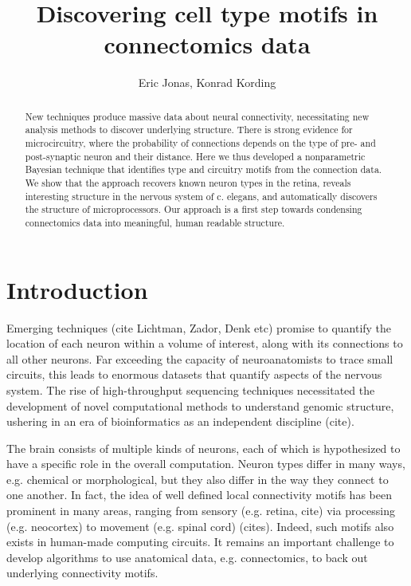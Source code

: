 \documentclass{article}
\title{Discovering cell type motifs in connectomics data}
\author{Eric Jonas, Konrad Kording}
\begin{document}
\maketitle


\begin{abstract}
  New techniques produce massive data about neural connectivity,
  necessitating new analysis methods to discover underlying
  structure. There is strong evidence for microcircuitry, where the
  probability of connections depends on the type of pre- and
  post-synaptic neuron and their distance. Here we thus developed a
  nonparametric Bayesian technique that identifies type and circuitry
  motifs from the connection data. We show that the approach recovers
  known neuron types in the retina, reveals interesting structure in
  the nervous system of c. elegans, and automatically discovers the
  structure of microprocessors. Our approach is a first step towards
  condensing connectomics data into meaningful, human readable
  structure.
\end{abstract}

\section*{Introduction}
Emerging techniques (cite Lichtman, Zador, Denk etc) promise to
quantify the location of each neuron within a volume of interest,
along with its connections to all other neurons. Far exceeding the
capacity of neuroanatomists to trace small circuits, this leads to
enormous datasets that quantify aspects of the nervous system. The
rise of high-throughput sequencing techniques necessitated the
development of novel computational methods to understand genomic
structure, ushering in an era of bioinformatics as an independent
discipline (cite).




The brain consists of multiple kinds of neurons, each of which is
hypothesized to have a specific role in the overall
computation. Neuron types differ in many ways, e.g. chemical or
morphological, but they also differ in the way they connect to one
another. In fact, the idea of well defined local connectivity motifs
has been prominent in many areas, ranging from sensory (e.g. retina,
cite) via processing (e.g. neocortex) to movement (e.g. spinal cord)
(cites). Indeed, such motifs also exists in human-made computing
circuits. It remains an important challenge to develop algorithms to
use anatomical data, e.g. connectomics, to back out underlying
connectivity motifs.
\end{document}
